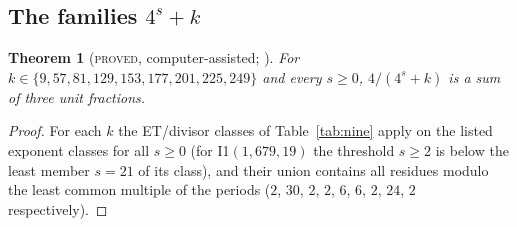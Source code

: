\documentclass[11pt,reqno]{amsart}
\newtheorem{theorem}{Theorem}[section]
\theoremstyle{definition}
\newcommand{\status}[1]{\textup{\textsc{#1}}}
\begin{document}
\subsection{The families $4^s+k$}
\begin{theorem}[\status{proved}, computer-assisted; \cite{SignFields}]\label{thm:nine}
For $k\in\{9,57,81,129,153,177,201,225,249\}$ and every $s\ge0$,
$4/(4^s+k)$ is a sum of three unit fractions.
\end{theorem}

\begin{proof}
For each $k$ the ET/divisor classes of Table~\ref{tab:nine} apply on the
listed exponent classes for all $s\ge0$ (for I1$(1,679,19)$ the threshold
$s\ge2$ is below the least member $s=21$ of its class), and their union
contains all residues modulo the least common multiple of the periods
($2$, $30$, $2$, $2$, $6$, $6$, $2$, $24$, $2$ respectively).
\end{proof}
\end{document}
